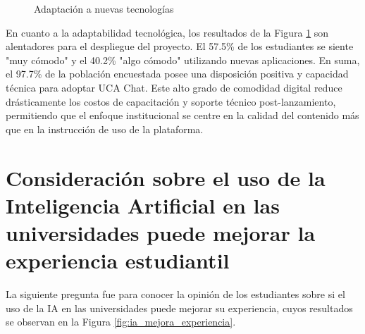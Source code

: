 {{\begin{figure}[H]
    \centering
    \caption{Adaptación a nuevas tecnologías}
    \label{fig:adaptacion_tecnologias}
\end{figure}

En cuanto a la adaptabilidad tecnológica, los resultados de la Figura \ref{fig:adaptacion_tecnologias} son alentadores para el despliegue del proyecto. El 57.5\% de los estudiantes se siente "muy cómodo" y el 40.2\% "algo cómodo" utilizando nuevas aplicaciones. En suma, el 97.7\% de la población encuestada posee una disposición positiva y capacidad técnica para adoptar UCA Chat. Este alto grado de comodidad digital reduce drásticamente los costos de capacitación y soporte técnico post-lanzamiento, permitiendo que el enfoque institucional se centre en la calidad del contenido más que en la instrucción de uso de la plataforma.

\section{Consideración sobre el uso de la Inteligencia Artificial en las universidades puede mejorar la experiencia estudiantil}
La siguiente pregunta fue para conocer la opinión de los estudiantes sobre si el uso de la IA en las universidades puede mejorar su experiencia, cuyos resultados se observan en la Figura \ref{fig:ia_mejora_experiencia}.


}}
